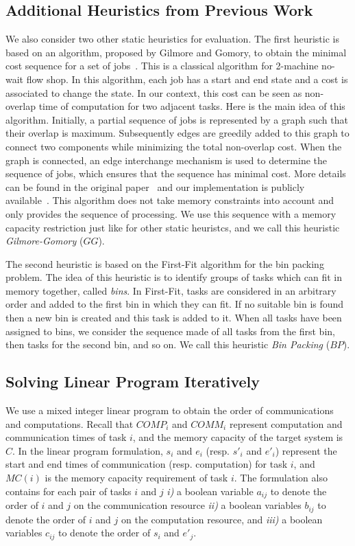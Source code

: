 \documentclass[sigconf]{acmart}
\begin{document}
	\subsection{Additional Heuristics from Previous Work}
	
	We also consider two other static heuristics for evaluation. The first heuristic is based on an algorithm, proposed by Gilmore and Gomory, to obtain the minimal cost sequence for a set of jobs~\cite{Gilmore-Gomory:1964}. This is a classical algorithm for 2-machine no-wait flow shop. In this algorithm, each job has a start and end state and a cost is associated to change the state. In our context, this cost can be seen as non-overlap time of computation for two adjacent tasks. Here is the main idea of this algorithm. Initially, a partial sequence of jobs is represented by a graph such that their overlap is maximum. Subsequently edges are greedily added to this graph to connect two components while minimizing the total non-overlap cost. When the graph is  connected, an edge interchange mechanism is used to determine the sequence of jobs, which ensures that the sequence has minimal cost. More details can be found in the original paper~\cite{Gilmore-Gomory:1964} and our implementation is publicly available~\cite{gitworkrepo}. This algorithm does not take memory constraints into account and only provides the sequence of processing. We use this sequence with a memory capacity restriction just like for other static heuristcs, and we call this heuristic \textit{Gilmore-Gomory} ($GG$).
	
	The second heuristic is based on the First-Fit algorithm for the bin packing problem. The idea of this heuristic is to identify groups of tasks which can fit in memory together, called \emph{bins}. In First-Fit, tasks are considered in an arbitrary order and added to the first bin in which they can fit. If no suitable bin is found then a new bin is created and this task is added to it. When all tasks have been assigned to bins, we consider the sequence made of all tasks from the first bin, then tasks for the second bin, and so on. We call this heuristic \textit{Bin Packing} ($BP$). 
	
	
	\subsection{Solving Linear Program Iteratively}
	\label{subsec:linearprogrammingformulation}
	We use a mixed integer linear program to obtain the order of communications and computations. Recall that $COMP_i$ and $COMM_i$ represent computation and communication times of task $i$, and the memory capacity of the target system is $C$. In the linear program formulation, $s_i$ and $e_i$ (resp. $s'_i$ and $e'_i$) represent the start and end times of communication (resp. computation) for task $i$, and $MC(i)$ is the memory capacity requirement of task $i$. The formulation also contains for each pair of tasks $i$ and $j$ \textit{i)} a boolean variable $a_{ij}$ to denote the order of $i$ and $j$ on the communication resource \textit{ii)} a boolean variables $b_{ij}$ to denote the order of $i$ and $j$ on the computation resource, and \textit{iii)} a boolean variables $c_{ij}$ to denote the order of $s_i$ and $e'_j$. 
	
\end{document}
